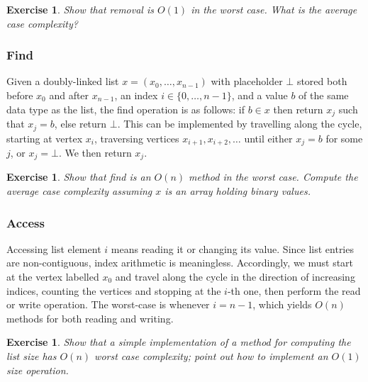 \documentclass[a4paper]{book}
\theoremstyle{changebreak}                %
\newtheorem{ex}[result]{Exercise}
\begin{document}
\begin{ex}
Show that removal is $O(1)$ in the worst case. What is the average
case complexity?
\end{ex}

\subsubsection{Find}
\label{s:list:find}
Given a doubly-linked list $x=(x_0,\ldots,x_{n-1})$ with placeholder
$\bot$ stored both before $x_0$ and after $x_{n-1}$, an index
$i\in\{0,\ldots,n-1\}$, and a value $b$ of the same data
type as the list, the find operation is as follows:
if $b\in x$ then return $x_j$ such that $x_j=b$, else return
$\bot$. This can be implemented by travelling along the
cycle, starting at vertex $x_i$, traversing vertices
$x_{i+1},x_{i+2},\ldots$ until either $x_j=b$ for some $j$, or
$x_j=\bot$. We then return $x_j$.

\begin{ex}
Show that find is an $O(n)$ method in the worst case. Compute the
average case complexity assuming $x$ is
an array holding binary values.
\end{ex}

\subsubsection{Access}
Accessing list
element $i$ means reading it or changing its value. Since list entries
are non-contiguous, index arithmetic is
meaningless. Accordingly, we must start at the vertex labelled $x_0$
and travel along the cycle in the direction of increasing indices,
counting the vertices and stopping at the $i$-th one, then perform the
read or write operation. The worst-case is whenever $i=n-1$, which
yields $O(n)$ methods for both reading and writing.

\begin{ex}
Show that a simple implementation of a method for computing the list
size has $O(n)$ worst case complexity; point out how to implement an
$O(1)$ size operation.
\end{ex}
\end{document}

